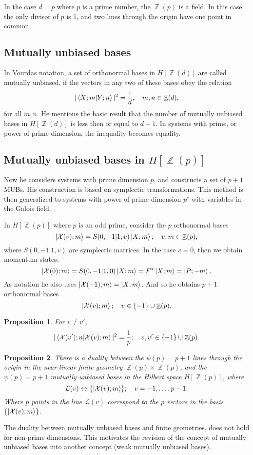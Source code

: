 \documentclass[a4paper]{article}
\DeclareMathOperator{\Z}{\mathbb{Z}}
\newtheorem{proposition}{Proposition}
\begin{document}
  In the case $d = p$ where $p$ is a prime number, the
  $\Z(p)$ is a field. In this case the only divisor of $p$ 
  is 1, and two lines through the origin have one point in
  common.

  \subsection{Mutually unbiased bases}

  In Vourdas notation, a set of orthonormal bases in
  $H[\Z(d)]$ are called mutually unbiased, if the vectors in
  any two of these bases obey the relation
  \[
    |\braket{X; m|Y; n}|^2 = \frac{1}{d}, 
    \quad m,n \in \Z(d),
  \] 
  for all $m,n$. He mentions the basic result that the
  number of mutually unbiased bases in $H[\Z(d)]$ is less
  then or equal to $d+1$. In systems with prime, or power of
  prime dimension, the inequality becomes equality. 

  \subsection{Mutually unbiased bases in $H[\Z(p)]$}

  Now he considers systems with prime dimension $p$, and
  constructs a set of $p+1$ MUBs. His construction is based
  on symplectic transformations. This method is then
  generalized to systems with power of prime dimension
  $p^{e}$ with variables in the Galois field.

  In $H[\Z(p)]$ where $p$ is an odd prime, consider the $p$ 
  orthonormal bases
  \[
    \ket{\mathcal{X}(v); m} = S(0,-1|1,v)\ket{X; m};
    \quad
    v,m \in \Z(p),
  \] 
  where $S(0,-1|1,v)$ are symplectic matrices. In the case
  $v = 0$, then we obtain momentum states:
  \[
    \ket{\mathcal{X}(0); m}
    = S(0,-1|1,0) \ket{X; m}
    = F^{*}\ket{X; m}
    = \ket{P; -m}.
  \] 
  As notation he also uses $\ket{\mathcal{X}(-1); m} =
  \ket{X; m}$. And so he obtains $p+1$ orthonormal bases
  \[
    \ket{\mathcal{X}(v); m};
    \quad 
    v \in \{-1\} \cup \Z(p).
  \] 
  \begin{proposition}
    For  $v \neq v'$, 
    \[
      |\braket{\mathcal{X}(v'); n|\mathcal{X}(v); m}|^2
      = \frac{1}{p};
      \quad
      v,v' \in \{-1\} \cup \Z(p).
    \] 
  \end{proposition}

  \begin{proposition}
    There is a duality between the $\psi(p) = p+1$ lines
    through the origin in the near-linear finite geometry
    $\Z(p) \times \Z(p)$, and the $\psi(p) = p+1$ mutually
    unbiased bases in the Hilbert space $H[\Z(p)]$, where
    \[
      \mathcal{L}(v) \leftrightarrow
      \{\ket{\mathcal{X}(v); m}\};
      \quad
      v = -1,\ldots,p-1.
    \] 
    Where $p$ points in the line $\mathcal{L}(v)$ correspond
    to the $p$ vectors in the basis $\{\ket{\mathcal{X}(v);
    m}\}$.
  \end{proposition}
  The duality between mutually unbiased bases and finite
  geometries, does not hold for non-prime dimensions. This
  motivates the revision of the concept of mutually unbiased
  bases into another concept (weak mutually unbiased bases).
\end{document}
